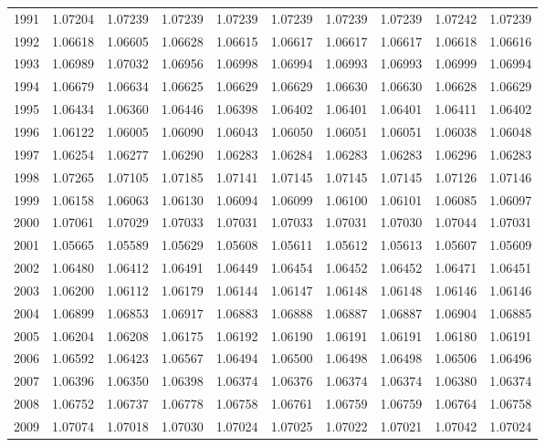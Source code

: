 \begin{tabular}{cccccccccc}
  1991 & 1.07204 & 1.07239 & 1.07239 & 1.07239 & 1.07239 & 1.07239 & 1.07239 & 1.07242 & 1.07239 \\ 
  1992 & 1.06618 & 1.06605 & 1.06628 & 1.06615 & 1.06617 & 1.06617 & 1.06617 & 1.06618 & 1.06616 \\ 
  1993 & 1.06989 & 1.07032 & 1.06956 & 1.06998 & 1.06994 & 1.06993 & 1.06993 & 1.06999 & 1.06994 \\ 
  1994 & 1.06679 & 1.06634 & 1.06625 & 1.06629 & 1.06629 & 1.06630 & 1.06630 & 1.06628 & 1.06629 \\ 
  1995 & 1.06434 & 1.06360 & 1.06446 & 1.06398 & 1.06402 & 1.06401 & 1.06401 & 1.06411 & 1.06402 \\ 
  1996 & 1.06122 & 1.06005 & 1.06090 & 1.06043 & 1.06050 & 1.06051 & 1.06051 & 1.06038 & 1.06048 \\ 
  1997 & 1.06254 & 1.06277 & 1.06290 & 1.06283 & 1.06284 & 1.06283 & 1.06283 & 1.06296 & 1.06283 \\ 
  1998 & 1.07265 & 1.07105 & 1.07185 & 1.07141 & 1.07145 & 1.07145 & 1.07145 & 1.07126 & 1.07146 \\ 
  1999 & 1.06158 & 1.06063 & 1.06130 & 1.06094 & 1.06099 & 1.06100 & 1.06101 & 1.06085 & 1.06097 \\ 
  2000 & 1.07061 & 1.07029 & 1.07033 & 1.07031 & 1.07033 & 1.07031 & 1.07030 & 1.07044 & 1.07031 \\ 
  2001 & 1.05665 & 1.05589 & 1.05629 & 1.05608 & 1.05611 & 1.05612 & 1.05613 & 1.05607 & 1.05609 \\ 
  2002 & 1.06480 & 1.06412 & 1.06491 & 1.06449 & 1.06454 & 1.06452 & 1.06452 & 1.06471 & 1.06451 \\ 
  2003 & 1.06200 & 1.06112 & 1.06179 & 1.06144 & 1.06147 & 1.06148 & 1.06148 & 1.06146 & 1.06146 \\ 
  2004 & 1.06899 & 1.06853 & 1.06917 & 1.06883 & 1.06888 & 1.06887 & 1.06887 & 1.06904 & 1.06885 \\ 
  2005 & 1.06204 & 1.06208 & 1.06175 & 1.06192 & 1.06190 & 1.06191 & 1.06191 & 1.06180 & 1.06191 \\ 
  2006 & 1.06592 & 1.06423 & 1.06567 & 1.06494 & 1.06500 & 1.06498 & 1.06498 & 1.06506 & 1.06496 \\ 
  2007 & 1.06396 & 1.06350 & 1.06398 & 1.06374 & 1.06376 & 1.06374 & 1.06374 & 1.06380 & 1.06374 \\ 
  2008 & 1.06752 & 1.06737 & 1.06778 & 1.06758 & 1.06761 & 1.06759 & 1.06759 & 1.06764 & 1.06758 \\ 
  2009 & 1.07074 & 1.07018 & 1.07030 & 1.07024 & 1.07025 & 1.07022 & 1.07021 & 1.07042 & 1.07024 \\ 
   \hline
\end{tabular}

